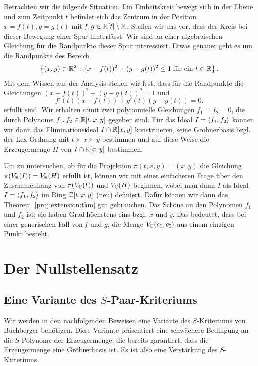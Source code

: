 \documentclass[11pt]{article}
\numberwithin{equation}{section}
\begin{document}
\begin{beispiel}
	Betrachten wir die folgende Situation. Ein Einheitskreis bewegt sich in der Ebene und zum Zeitpunkt $t$ befindet sich das Zentrum in der Position $x = f(t), y = g(t)$ mit $f,g \in \mathbb{R}[t] \setminus \mathbb{R}$. Stellen wir uns vor, dass der Kreis bei dieser Bewegung einer Spur hinterlässt. Wir sind an einer algebraischen Gleichung für die Randpunkte dieser Spur interessiert. Etwas genauer geht es um die Randpunkte des Bereich
	\[
		\left\{  (x,y) \in \mathbb{R}^2  \,:\,  (x - f(t))^2  + (y-g(t))^2 \le 1 \ \text{für ein} \ t \in \mathbb{R} \right\}. 
	\]
	Mit dem Wissen aus der Analysis stellen wir fest, dass für die Randpunkte die Gleichungen $(x-f(t))^2 + (y-g(t))^2= 1$ und 
	\[
			f'(t) (x-f(t)) + g'(t) (y-g(t))=0.
	\]
	erfüllt sind. Wir erhalten somit zwei polynomielle Gleichungen $f_ 1 = f_2 =0$, die durch Polynome $f_1, f_2 \in \mathbb{R}[t,x,y]$ gegeben sind. Für das Ideal $I = \left< f_1,f_2 \right>$ können wir dann das Eliminationsideal $I \cap \mathbb{R}[x,y]$ konstruieren, seine Gröbnerbasis bzgl. der Lex-Ordnung mit $t \succ x \succ y$ bestimmen und auf diese Weise die Erzeugermenge $H$ von $I \cap \mathbb{R}[x,y]$ bestimmen. 
	
	 Um zu untersuchen, ob für die Projektion $\pi(t,x,y) = (x,y)$  die Gleichung $\pi(V_{\mathbb{R}}( I)) = V_{\mathbb{R}}(H)$ erfüllt ist, können wir mit einer einfacheren Frage über den Zusammenhang von $\pi(V_{\mathbb{C}}(I))$ und $V_{\mathbb{C}}(H)$ beginnen, wobei man dann $I$ als Ideal $I= \left< f_1, f_2 \right>$ im Ring $\mathbb{C}[t,x,y]$ (neu) definiert. Dafür können wir dann das Theorem~\ref{proj:extension:thm} gut gebrauchen. Das Schöne an den Polynomen $f_1$ und $f_2$ ist: sie haben Grad höchstens eins bzgl. $x$ und $y$. Das bedeutet, dass bei einer generischen Fall von $f$ und $g$, die Menge $V_{\mathbb{C}}(c_1,c_2)$ aus einem einzigen Punkt besteht.  
\end{beispiel} 


 

\section{Der Nullstellensatz}

\subsection{Eine Variante des $S$-Paar-Kriteriums}

Wir werden in den nachfolgenden Beweisen eine Variante des $S$-Kriteriums von Buchberger benötigen. Diese Variante präsentiert eine schwächere Bedingung an die $S$-Polynome der Erzeugermenge, die bereits garantiert, dass die Erzeugermenge eine Gröbnerbasis ist. Es ist also eine Verstärkung des $S$-Ktiteriums. 
\end{document}
